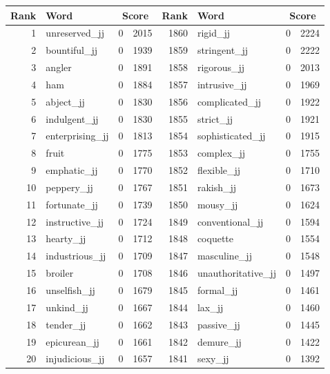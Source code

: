 \begin{table}[tbp]
    \begin{tabular}{| rlr@{.}l | rlr@{.}l |}
    \hline
    \textbf{Rank} & \textbf{Word} & \multicolumn{2}{c|}{\textbf{Score}} & \textbf{Rank} & \textbf{Word} & \multicolumn{2}{c|}{\textbf{Score}} \\
    \hline
    1 & unreserved\_jj & 0 & 2015    &    1860 & rigid\_jj & 0 & 2224 \\
    2 & bountiful\_jj & 0 & 1939    &    1859 & stringent\_jj & 0 & 2222 \\
    3 & angler & 0 & 1891    &    1858 & rigorous\_jj & 0 & 2013 \\
    4 & ham & 0 & 1884    &    1857 & intrusive\_jj & 0 & 1969 \\
    5 & abject\_jj & 0 & 1830    &    1856 & complicated\_jj & 0 & 1922 \\
    6 & indulgent\_jj & 0 & 1830    &    1855 & strict\_jj & 0 & 1921 \\
    7 & enterprising\_jj & 0 & 1813    &    1854 & sophisticated\_jj & 0 & 1915 \\
    8 & fruit & 0 & 1775    &    1853 & complex\_jj & 0 & 1755 \\
    9 & emphatic\_jj & 0 & 1770    &    1852 & flexible\_jj & 0 & 1710 \\
    10 & peppery\_jj & 0 & 1767    &    1851 & rakish\_jj & 0 & 1673 \\
    11 & fortunate\_jj & 0 & 1739    &    1850 & mousy\_jj & 0 & 1624 \\
    12 & instructive\_jj & 0 & 1724    &    1849 & conventional\_jj & 0 & 1594 \\
    13 & hearty\_jj & 0 & 1712    &    1848 & coquette & 0 & 1554 \\
    14 & industrious\_jj & 0 & 1709    &    1847 & masculine\_jj & 0 & 1548 \\
    15 & broiler & 0 & 1708    &    1846 & unauthoritative\_jj & 0 & 1497 \\
    16 & unselfish\_jj & 0 & 1679    &    1845 & formal\_jj & 0 & 1461 \\
    17 & unkind\_jj & 0 & 1667    &    1844 & lax\_jj & 0 & 1460 \\
    18 & tender\_jj & 0 & 1662    &    1843 & passive\_jj & 0 & 1445 \\
    19 & epicurean\_jj & 0 & 1661    &    1842 & demure\_jj & 0 & 1422 \\
    20 & injudicious\_jj & 0 & 1657    &    1841 & sexy\_jj & 0 & 1392 \\

\end{tabular}
\end{table}
